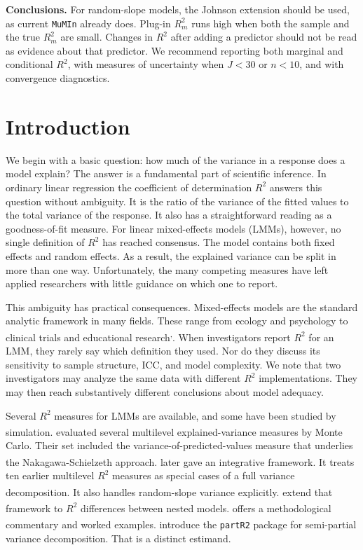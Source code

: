 \documentclass[
  11pt,
]{article}
\begin{document}
\textbf{Conclusions.} For random-slope models, the Johnson extension
should be used, as current \texttt{MuMIn} already does. Plug-in \(R^2_m\)
runs high when both the sample and the true \(R^2_m\) are small.
Changes in \(R^2\) after adding a predictor should not be read as
evidence about that predictor. We recommend reporting both
marginal and conditional \(R^2\), with measures of uncertainty when
\(J < 30\) or \(n < 10\), and with convergence diagnostics.

\section{Introduction}\label{introduction}

We begin with a basic question: how much of the variance in a
response does a model explain? The answer is a fundamental part
of scientific inference. In ordinary linear regression the
coefficient of determination \(R^2\) answers this question without
ambiguity. It is the ratio of the variance of the fitted values to
the total variance of the response. It also has a straightforward
reading as a goodness-of-fit measure. For linear mixed-effects
models (LMMs), however, no single definition of \(R^2\) has reached
consensus. The model contains both fixed effects and random
effects. As a result, the explained variance can be split in more
than one way. Unfortunately, the many competing measures have left
applied researchers with little guidance on which one to report.

This ambiguity has practical consequences. Mixed-effects models
are the standard analytic framework in many fields. These range
from ecology and psychology to clinical trials and educational
research\textsuperscript{,}. When
investigators report \(R^2\) for an LMM, they rarely say which
definition they used. Nor do they discuss its sensitivity to
sample structure, ICC, and model complexity. We note that two
investigators may analyze the same data with different \(R^2\)
implementations. They may then reach substantively different
conclusions about model adequacy.

Several \(R^2\) measures for LMMs are available, and some have been
studied by simulation.\textsuperscript{}
evaluated several multilevel explained-variance measures by Monte
Carlo. Their set included the variance-of-predicted-values measure
that underlies the Nakagawa-Schielzeth approach.\textsuperscript{} later gave an integrative
framework. It treats ten earlier multilevel \(R^2\) measures as
special cases of a full variance decomposition. It also handles
random-slope variance explicitly.\textsuperscript{} extend that framework to \(R^2\)
differences between nested models.\textsuperscript{}
offers a methodological commentary and worked examples.\textsuperscript{} introduce the \texttt{partR2} package for
semi-partial variance decomposition. That is a distinct estimand.
\end{document}
